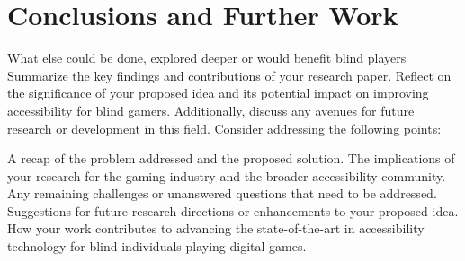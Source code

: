 \documentclass[sigconf,natbib=false,10pt]{acmart}
\begin{document}
	\section{Conclusions and Further Work}
	What else could be done, explored deeper or would benefit blind players
	Summarize the key findings and contributions of your research paper. Reflect on the significance of your proposed idea and its potential impact on improving accessibility for blind gamers. Additionally, discuss any avenues for future research or development in this field. Consider addressing the following points:
	
	A recap of the problem addressed and the proposed solution.
	The implications of your research for the gaming industry and the broader accessibility community.
	Any remaining challenges or unanswered questions that need to be addressed.
	Suggestions for future research directions or enhancements to your proposed idea.
	How your work contributes to advancing the state-of-the-art in accessibility technology for blind individuals playing digital games.
	
	
	\printbibliography
	
\end{document}
